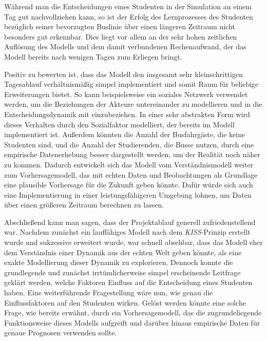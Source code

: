 \documentclass[12pt,a4paper]{scrartcl}
\begin{document}
Während man die Entscheidungen eines Studenten in der Simulation an einem Tag gut nachvollziehen kann, so ist der Erfolg des Lernprozesses des Studenten bezüglich seiner bevorzugten Buslinie über einen längeren Zeitraum nicht besonders gut erkennbar. Dies liegt vor allem an der sehr hohen zeitlichen Auflösung des Modells und dem damit verbundenen Rechenaufwand, der das Modell bereits nach wenigen Tagen zum Erliegen bringt.

Positiv zu bewerten ist, dass das Modell den insgesamt sehr kleinschrittigen Tagesablauf verhältnismäßig simpel implementiert und somit Raum für beliebige Erweiterungen bietet. So kann beispielsweise ein soziales Netzwerk verwendet werden, um die Beziehungen der Akteure untereinander zu modellieren und in die Entscheidungsdynamik mit einzubeziehen. In einer sehr abstrakten Form wird dieses Verhalten durch den Sozialfaktor modelliert, der bereits im Modell implementiert ist. Außerdem könnten die Anzahl der Busfahrgäste, die keine Studenten sind, und die Anzahl der Studierenden, die Busse nutzen, durch eine empirische Datenerhebung besser dargestellt werden, um der Realität noch näher zu kommen. Dadurch entwickelt sich das Modell vom Verständnismodell weiter zum Vorhersagemodell, das mit echten Daten und Beobachtungen als Grundlage eine plausible Vorhersage für die Zukunft geben könnte. Dafür würde sich auch eine Implementierung in einer leistungsfähigeren Umgebung lohnen, um Daten über einen größeren Zeitraum berechnen zu lassen. 

Abschließend kann man sagen, dass der Projektablauf generell zufriedenstellend war. Nachdem zunächst ein lauffähiges Modell nach dem \textit{KISS}-Prinzip erstellt wurde und sukzessive erweitert wurde, war schnell absehbar, dass das Modell eher dem Verständnis einer Dynamik aus der echten Welt geben könnte, als eine exakte Modellierung dieser Dynamik zu explorieren. Dennoch konnte die grundlegende und zunächst irrtümlicherweise simpel erscheinende Leitfrage geklärt werden, welche Faktoren Einfluss auf die Entscheidung eines Studenten haben.
Eine weiterführende Fragestellung wäre nun, wie genau die Einflussfaktoren auf den Studenten wirken. Gelöst werden könnte eine solche Frage, wie bereits erwähnt, durch ein Vorhersagemodell, das die zugrundeliegende Funktionsweise dieses Modells aufgreift und darüber hinaus empirische Daten für genaue Prognosen verwenden sollte.
\end{document}
